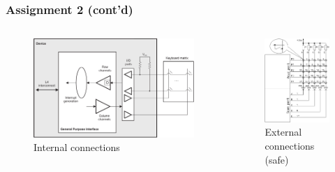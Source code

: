 \documentclass[aspectratio=169,usenames,dvipsnames]{beamer}
\newcounter{cont}
\begin{document}
\begin{frame}
  \frametitle{Assignment 2 (cont'd)}
  \vspace*{-5mm}
  \begin{columns}
      \begin{figure}
        \centering
        \includegraphics[scale=0.23]{images/keypad-scan2.png}
        \caption{Internal connections}
      \end{figure}
      \begin{figure}
        \centering
        \includegraphics[scale=0.4]{images/keypad-scan1.png}
        \caption{External connections (safe)}
      \end{figure}
  \end{columns}
  \vspace*{-10mm}
\end{frame}
\end{document}
